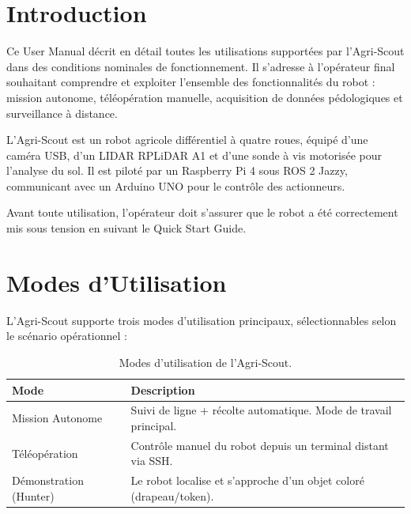 \documentclass [12pt, a4paper]{article}
\begin{document}


\renewcommand{\contentsname}{\centering Sommaire}
\tableofcontents
\thispagestyle{empty} 
\setcounter{page}{0} 

\newpage
\section{Introduction}
Ce User Manual décrit en détail toutes les utilisations supportées par l'Agri-Scout dans des conditions nominales de fonctionnement. Il s'adresse à l'opérateur final souhaitant comprendre et exploiter l'ensemble des fonctionnalités du robot : mission autonome, téléopération manuelle, acquisition de données pédologiques et surveillance à distance.

L'Agri-Scout est un robot agricole différentiel à quatre roues, équipé d'une caméra USB, d'un LIDAR RPLiDAR A1 et d'une sonde à vis motorisée pour l'analyse du sol. Il est piloté par un Raspberry Pi 4 sous ROS 2 Jazzy, communicant avec un Arduino UNO pour le contrôle des actionneurs.

Avant toute utilisation, l'opérateur doit s'assurer que le robot a été correctement mis sous tension en suivant le Quick Start Guide.

\section{Modes d'Utilisation}

L'Agri-Scout supporte trois modes d'utilisation principaux, sélectionnables selon le scénario opérationnel :

\begin{table}[H]
\centering
\begin{tabularx}{\textwidth}{lX}
\toprule
\textbf{Mode} & \textbf{Description} \\
\midrule
Mission Autonome & Suivi de ligne + récolte automatique. Mode de travail principal. \\
Téléopération & Contrôle manuel du robot depuis un terminal distant via SSH. \\
Démonstration (Hunter) & Le robot localise et s'approche d'un objet coloré (drapeau/token). \\
\bottomrule
\end{tabularx}
\caption{Modes d'utilisation de l'Agri-Scout.}
\end{table}

\end{document}
